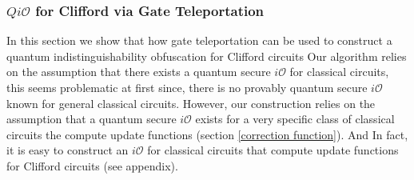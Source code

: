 \begin{comment}
\anote{``reveals no knowledge'' is misleading. Actually, iO can reveal alot of knowledge. The point is that the output of the obfuscators are indistinguishable, which is the case.}


\end{comment}



\subsubsection{$Qi\mathcal{O}$ for Clifford via Gate Teleportation}
\label{sec:Clifford-iO-teleportaion}
In this section we  show that how gate teleportation can be used to construct a quantum indistinguishability obfuscation for Clifford circuits Our algorithm relies on the assumption that there exists a quantum secure $i\mathcal{O}$ for classical circuits, this seems problematic at first since, there is no provably quantum secure $i\mathcal{O}$ known for general classical circuits. 
However,  our construction relies on the assumption that a quantum secure $i\mathcal{O}$ exists for a very specific class of classical circuits the compute update functions (section \ref{correction function}). And In fact, it is easy to construct an $i\mathcal{O}$ for classical circuits that compute update functions for Clifford circuits (see appendix). %



